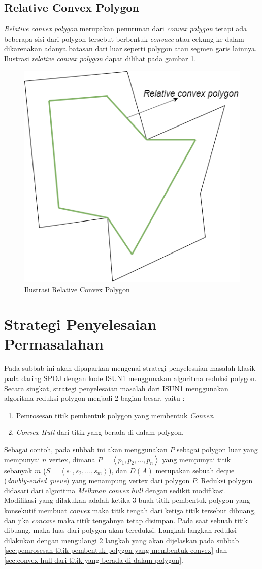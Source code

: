 \subsection{Relative Convex Polygon}
\textit{Relative convex polygon} merupakan penurunan dari \textit{convex polygon} tetapi ada beberapa sisi dari polygon tersebut berbentuk \textit{convace} atau cekung ke dalam dikarenakan adanya batasan dari luar seperti polygon atau segmen garis lainnya. Ilustrasi \textit{relative convex polygon} dapat dilihat pada gambar \ref{fig:ilustrasi-relative-convex-polygon}.
\begin{figure}[!h]
    \Centering
    \includegraphics[width=0.5\columnwidth]{bab2/img/ilustrasi-relative-convex-polygon}
    \caption{Ilustrasi Relative Convex Polygon}
    \label{fig:ilustrasi-relative-convex-polygon}
\end{figure}
\section{Strategi Penyelesaian Permasalahan}
Pada subbab ini akan dipaparkan mengenai strategi penyelesaian masalah klasik pada daring SPOJ dengan kode ISUN1 menggunakan algoritma reduksi polygon. Secara singkat, strategi penyelesaian masalah dari ISUN1 menggunakan algoritma reduksi polygon menjadi 2 bagian besar, yaitu :
\begin{enumerate}
    \item Pemrosesan titik pembentuk polygon yang membentuk \textit{Convex}.
    \item \textit{Convex Hull} dari titik yang berada di dalam polygon.
\end{enumerate}
Sebagai contoh, pada subbab ini akan menggunakan $P$ sebagai polygon luar yang mempunyai $n$ vertex, dimana $P = \left \langle p_1, p_2, ..., p_n \right \rangle$ yang mempunyai titik sebanyak $m$ ($S = \left \langle s_1, s_2, ..., s_m \right \rangle$), dan $D(A)$ merupakan sebuah deque (\textit{doubly-ended queue}) yang menampung vertex dari polygon $P$. Reduksi polygon didasari dari algoritma \textit{Melkman convex hull} dengan sedikit modifikasi. Modifikasi yang dilakukan adalah ketika 3 buah titik pembentuk polygon yang konsekutif membuat \textit{convex} maka titik tengah dari ketiga titik tersebut dibuang, dan jika \textit{concave} maka titik tengahnya tetap disimpan. Pada saat sebuah titik dibuang, maka luas dari polygon akan tereduksi. Langkah-langkah reduksi dilakukan dengan mengulangi 2 langkah yang akan dijelaskan pada subbab \ref{sec:pemrosesan-titik-pembentuk-polygon-yang-membentuk-convex} dan \ref{sec:convex-hull-dari-titik-yang-berada-di-dalam-polygon}.


